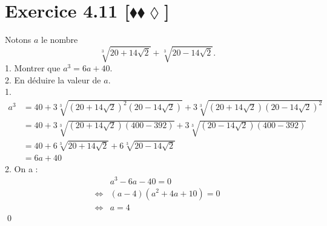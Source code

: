 \documentclass[10pt]{article}
\begin{document}
\section*{Exercice 4.11 [$\blacklozenge\blacklozenge\lozenge$]}
\begin{tcolorbox}[enhanced, width=7in, center, size=fbox, fontupper=\large, drop shadow southwest]
    Notons $a$ le nombre
    \begin{equation*}
        \sqrt[3]{20+14\sqrt{2}}+\sqrt[3]{20-14\sqrt{2}}.
    \end{equation*}
    1. Montrer que $a^3=6a+40$.\\
    2. En déduire la valeur de $a$.\\[0.25cm]
    1.
    \begin{align*}
        a^3&=40+3\sqrt[3]{(20+14\sqrt{2})^2(20-14\sqrt{2})}+3\sqrt[3]{(20+14\sqrt{2})(20-14\sqrt{2})^2}\\
        &=40+3\sqrt[3]{(20+14\sqrt{2})(400-392)}+3\sqrt[3]{(20-14\sqrt{2})(400-392)}\\
        &=40+6\sqrt[3]{20+14\sqrt{2}}+6\sqrt[3]{20-14\sqrt{2}}\\
        &=6a+40
    \end{align*}
    2. On a :
    \begin{align*}
        &a^3-6a-40=0\\
        \iff&(a-4)(a^2+4a+10)=0\\
        \iff&a=4
    \end{align*}
    \qed
\end{tcolorbox}
\end{document}
